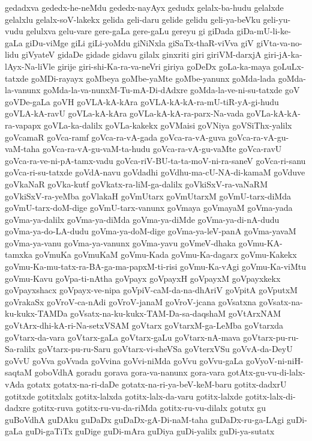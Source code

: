 {gedadxva
gededx-he-neMdu
gededx-nayAyx
gedudx
gelalx-ba-hudu
gelalxde
gelalxlu
gelalx-soV-lakekx
gelida
geli-daru
gelide
gelidu
geli-ya-beVku
geli-yu-vudu
gelulxva
gelu-vare
gere-gaLa
gere-gaLu
gereyu
gi
giDada
giDa-mU-li-ke-gaLa
giDu-viMge
giLi
giLi-yoMdu
giNiNxla
giSaTx-thaR-viVva
giV
giVta-va-no-lidu
giVyateV
gidaDe
gidade
gidavu
gilalx
ginxriti
giri
giriVM-darxjA
giri-jA-ka-lAyx-Na-liVle
girije
giri-shi-Ka-ra-va-neVri
giriya
goDeDx
goLa-ka-maya
goLuLx-tatxde
goMDi-rayayx
goMbeya
goMbe-yaMte
goMbe-yanunx
goMda-lada
goMda-la-vanunx
goMda-la-va-nunxM-Tu-mA-Di-dAdxre
goMda-la-ve-ni-su-tatxde
goV
goVDe-gaLa
goVH
goVLA-kA-kAra
goVLA-kA-kA-ra-mU-tiR-yA-gi-hudu
goVLA-kA-ravU
goVLa-kA-kAra
goVLa-kA-kA-ra-parx-Na-vada
goVLa-kA-kA-ra-vapapx
goVLa-ka-dalilx
goVLa-kakekx
goVMaisi
goVNiya
goVSiThx-yalilx
goVcamaR
goVca-ramf
goVca-ra-vA-gada
goVca-ra-vA-guva
goVca-ra-vA-gu-vaM-taha
goVca-ra-vA-gu-vaM-ta-hudu
goVca-ra-vA-gu-vaMte
goVca-ravU
goVca-ra-ve-ni-pA-tamx-vadu
goVca-riV-BU-ta-ta-moV-ni-ra-saneV
goVca-ri-sanu
goVca-ri-su-tatxde
goVdA-navu
goVdadhi
goVdhu-ma-cU-NA-di-kamaM
goVduve
goVkaNaR
goVka-kutf
goVkatx-ra-liM-ga-dalilx
goVkiSxV-ra-vaNaRM
goVkiSxV-ra-yeMba
goVlakaH
goVmUtarx
goVmUtarxM
goVmU-tarx-diMda
goVmU-tarx-doM-dige
goVmU-tarx-vanunx
goVmaya
goVmayaM
goVma-yada
goVma-ya-dalilx
goVma-ya-diMda
goVma-ya-diMde
goVma-ya-di-nA-dudu
goVma-ya-do-LA-dudu
goVma-ya-doM-dige
goVma-ya-leV-panA
goVma-yavaM
goVma-ya-vanu
goVma-ya-vanunx
goVma-yavu
goVmeV-dhaka
goVmu-KA-tamxka
goVmuKa
goVmuKaM
goVmu-Kada
goVmu-Ka-dagarx
goVmu-Kakekx
goVmu-Ka-mu-tatx-ra-BA-ga-ma-papxM-ti-risi
goVmu-Ka-vAgi
goVmu-Ka-viMtu
goVmu-Kavu
goVpa-ti-nAtha
goVpayx
goVpayxH
goVpayxM
goVpayxkekx
goVpayxshacx
goVpayx-ve-nipa
goVpiV-caM-da-na-dhAriV
goVpitA
goVputxM
goVrakaSx
goVroV-ca-nAdi
goVroV-janaM
goVroV-jcana
goVsatxna
goVsatx-na-ku-kukx-TAMDa
goVsatx-na-ku-kukx-TAM-Da-sa-daqshaM
goVtArxNAM
goVtArx-dhi-kA-ri-Na-setxVSAM
goVtarx
goVtarxM-ga-LeMba
goVtarxda
goVtarx-da-vara
goVtarx-gaLa
goVtarx-gaLu
goVtarx-nA-mava
goVtarx-pu-ru-Sa-ralilx
goVtarx-pu-ru-Saru
goVtarx-vi-sheVSa
goVterxVSu
goVvA-da-DeyU
goVvU
goVva
goVvada
goVvina
goVvi-niMda
goVvu
goVvu-gaLa
goVyoV-ni-niH-saqtaM
goboVdhA
goradu
gorava
gora-va-nanunx
gora-vara
gotAtx-gu-vu-di-lalx-vAda
gotatx
gotatx-na-ri-daDe
gotatx-na-ri-ya-beV-keM-baru
gotitx-dadxrU
gotitxde
gotitxlalx
gotitx-lalxda
gotitx-lalx-da-varu
gotitx-lalxde
gotitx-lalx-di-dadxre
gotitx-ruva
gotitx-ru-vu-da-riMda
gotitx-ru-vu-dilalx
gotutx
gu
guBoVdhA
guDAku
guDaDx
guDaDx-gA-Di-naM-taha
guDaDx-ru-ga-LAgi
guDi-gaLa
guDi-gaTiTx
guDige
guDi-mAra
guDiya
guDi-yalilx
guDi-ya-sutatx
}
